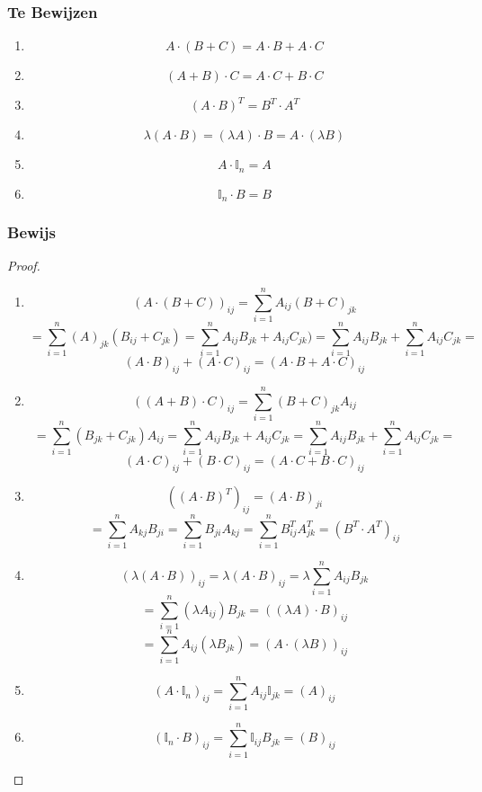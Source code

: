 \documentclass[lineaire_algebra_oplossingen.tex]{subfiles}
\begin{document}
\subsubsection*{Te Bewijzen}
\begin{enumerate}
\item \[ A\cdot (B+C) = A\cdot B + A \cdot C\]
\item \[ (A+B) \cdot C = A\cdot C + B \cdot C \]
\item \[ (A\cdot B)^T  = B^T \cdot A^T \]
\item \[ \lambda(A\cdot B) = (\lambda A)\cdot B = A \cdot (\lambda B)\]
\item \[ A \cdot \mathbb{I}_{n} = A \]
\item \[ \mathbb{I}_{n} \cdot B = B \]
\end{enumerate}
\subsubsection*{Bewijs}
\begin{proof}
\begin{enumerate}
\item 
\[ (A\cdot (B+C))_{ij} = \sum_{i=1}^nA_{ij}(B+C)_{jk}\]
\[ = \sum_{i=1}^n(A)_{jk}(B_{ij}+C_{jk}) = \sum_{i=1}^n A_{ij}B_{jk}+A_{ij}C_{jk}) = \sum_{i=1}^nA_{ij}B_{jk} + \sum_{i=1}^nA_{ij}C_{jk} = \]
\[ (A\cdot B)_{ij} + (A \cdot C)_{ij} = (A\cdot B + A \cdot C)_{ij}\]

\item 
\[ ((A+B) \cdot C)_{ij} = \sum_{i=1}^n(B+C)_{jk}A_{ij}\]
\[ = \sum_{i=1}^n(B_{jk}+C_{jk})A_{ij} = \sum_{i=1}^n A_{ij}B_{jk}+A_{ij}C_{jk} = \sum_{i=1}^nA_{ij}B_{jk} + \sum_{i=1}^nA_{ij}C_{jk} = \]
\[ (A\cdot C)_{ij} + (B \cdot C)_{ij} = (A\cdot C + B \cdot C)_{ij} \]
\item 
\[ ((A\cdot B)^T)_{ij}  = (A\cdot B)_{ji}\]
\[ = \sum_{i=1}^nA_{kj}B_{ji} = \sum_{i=1}^nB_{ji}A_{kj} = \sum_{i=1}^nB^T_{ij}A^T_{jk} = (B^T \cdot A^T)_{ij} \]
\item 
\[ (\lambda(A\cdot B))_{ij} = \lambda(A\cdot B)_{ij} = \lambda\sum_{i=1}^nA_{ij}B_{jk}\]
\[ = \sum_{i=1}^n(\lambda A_{ij})B_{jk} = ((\lambda A)\cdot B)_{ij} \]
\[ = \sum_{i=1}^nA_{ij}(\lambda B_{jk}) = (A \cdot (\lambda B))_{ij}\]
\item 
\[ (A \cdot \mathbb{I}_{n})_{ij} = \sum_{i=1}^nA_{ij}\mathbb{I}_{jk} = (A)_{ij} \]
\item 
\[ (\mathbb{I}_{n} \cdot B)_{ij} =  \sum_{i=1}^n\mathbb{I}_{ij}B_{jk} =  (B)_{ij} \]
\end{enumerate}
\end{proof}
\end{document}
